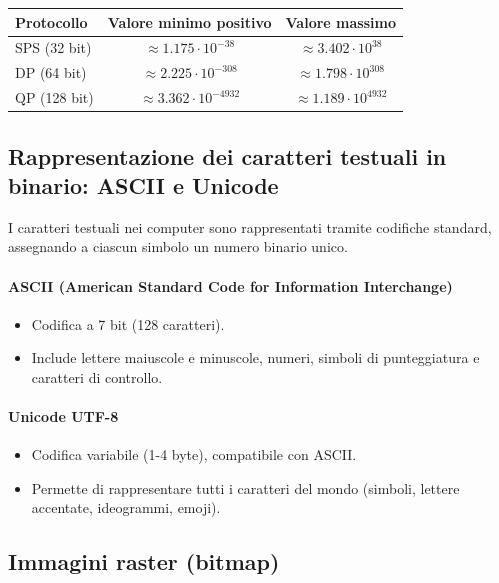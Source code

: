 \documentclass[12pt]{article}
\begin{document}
\begin{center}
\begin{tabular}{|l|c|c|}
\hline
\textbf{Protocollo} & \textbf{Valore minimo positivo} & \textbf{Valore massimo} \\ \hline
SPS (32 bit) & $\approx 1.175 \cdot 10^{-38}$ & $\approx 3.402 \cdot 10^{38}$ \\ \hline
DP (64 bit) & $\approx 2.225 \cdot 10^{-308}$ & $\approx 1.798 \cdot 10^{308}$ \\ \hline
QP (128 bit) & $\approx 3.362 \cdot 10^{-4932}$ & $\approx 1.189 \cdot 10^{4932}$ \\ \hline
\end{tabular}
\end{center}

\subsection{Rappresentazione dei caratteri testuali in binario: ASCII e Unicode}

I caratteri testuali nei computer sono rappresentati tramite codifiche standard, assegnando a ciascun simbolo un numero binario unico.

\paragraph{ASCII (American Standard Code for Information Interchange)}
\begin{itemize}
    \item Codifica a 7 bit (128 caratteri).
    \item Include lettere maiuscole e minuscole, numeri, simboli di punteggiatura e caratteri di controllo.
\end{itemize}
\paragraph{Unicode UTF-8}
\begin{itemize}
    \item Codifica variabile (1-4 byte), compatibile con ASCII.
    \item Permette di rappresentare tutti i caratteri del mondo (simboli, lettere accentate, ideogrammi, emoji).
\end{itemize}

\subsection{Immagini raster (bitmap)}
\end{document}
